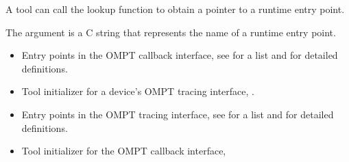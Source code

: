 A tool can call the lookup function to obtain a pointer to a runtime
entry point.

\argdesc
The argument  is a C string
that represents the name of a runtime entry point.

\crossreferences
\begin{itemize}
\item Entry points in the OMPT callback interface, see
   for a list and
   for detailed definitions.
\item Tool initializer for a device's OMPT tracing interface, .
\item Entry points in the OMPT tracing interface, see
   for a list and
   for detailed definitions.
\item Tool initializer for the OMPT callback interface, 
\end{itemize}
